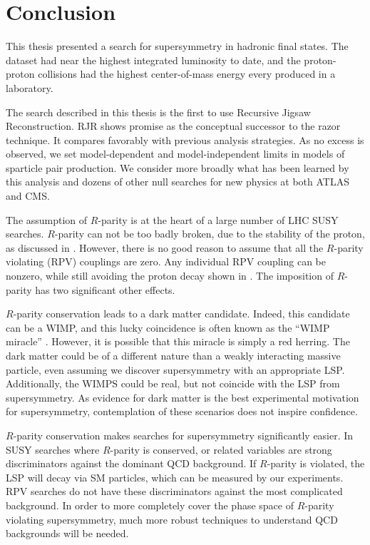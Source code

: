 
\chapter[Conclusion][Conclusion]{Conclusion} %

This thesis presented a search for supersymmetry in hadronic final states.
The dataset had near the highest integrated luminosity to date, and the proton-proton collisions had the highest center-of-mass energy every produced in a laboratory.

The search described in this thesis is the first to use Recursive Jigsaw Reconstruction.
RJR shows promise as the  conceptual successor to the razor technique.
It compares favorably with previous analysis strategies.
As no excess is observed, we set model-dependent and model-independent limits in models of sparticle pair production.
We consider more broadly what has been learned by this analysis and dozens of other null searches for new physics at both ATLAS and CMS.

The assumption of $R$-parity is at the heart of a large number of LHC SUSY searches.
$R$-parity can not be too badly broken, due to the stability of the proton, as discussed in .
However, there is no good reason to assume that all the $R$-parity violating (RPV) couplings are zero.
Any individual RPV coupling can be nonzero, while still avoiding the proton decay shown in .
The imposition of $R$-parity has two significant other effects.

$R$-parity conservation leads to a dark matter candidate.
Indeed, this candidate can be a WIMP, and this lucky coincidence is often known as the ``WIMP miracle'' \cite{darkMatterPrimer}.
However, it is possible that this miracle is simply a red herring.
The dark matter could be of a different nature than a weakly interacting massive particle, even assuming we discover supersymmetry with an appropriate LSP.
Additionally, the WIMPS could be real, but not coincide with the LSP from supersymmetry.
As evidence for dark matter is the best experimental motivation for supersymmetry, contemplation of these scenarios does not inspire confidence.

$R$-parity conservation makes searches for supersymmetry significantly easier.
In SUSY searches where $R$-parity is conserved, \met or related variables are strong discriminators against the dominant QCD background.
If $R$-parity is violated, the LSP will decay via SM particles, which can be measured by our experiments.
RPV searches do not have these discriminators against the most complicated background.
In order to more completely cover the phase space of $R$-parity violating supersymmetry, much more robust techniques to understand QCD backgrounds will be needed.

